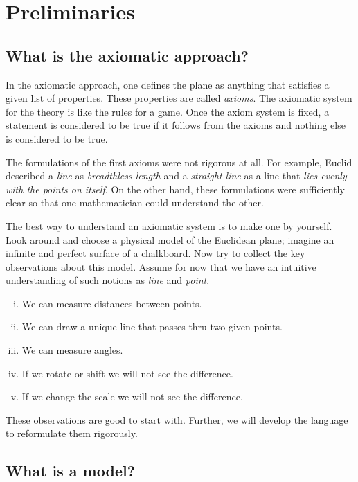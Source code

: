 \chapter{Preliminaries}\label{chap:metr}


\section{What is the axiomatic approach?}
\label{preaxioms}

In the axiomatic approach, one defines the plane as anything that satisfies a given list of properties.
These properties are called {}\emph{axioms}.
The axiomatic system for the theory 
is like the rules for a game.
Once the axiom system is fixed, a statement is considered to be true if it follows from the axioms and nothing else is considered to be true.

The formulations of the first axioms were not rigorous at all.
For example, Euclid described a {}\emph{line} as \textit{breadthless length}
and a {}\emph{straight line} as a line that \textit{lies evenly with the points on itself}.
On the other hand,
these formulations were sufficiently clear 
so that one mathematician could understand the other.

The best way to understand an axiomatic system
is to make one by yourself.
Look around and choose a physical model 
of the Euclidean plane;
imagine an infinite and perfect surface of a chalkboard. 
Now try to collect the key observations
about this model.
Assume for now that we have an intuitive understanding of such notions as {}\emph{line} and {}\emph{point}.
\begin{enumerate}[(i)]
 \item\label{preaxiomI} We can measure distances between points.
 \item\label{preaxiomII} We can draw a unique line 
 that passes thru two given points.
 \item\label{preaxiomIII} We can measure angles.
 \item\label{preaxiomIV} If we rotate or shift we will not see the difference.
 \item\label{preaxiomV} If we change the scale we will not see the difference.
\end{enumerate}
These observations are good to start with.
Further, we will develop the language to reformulate them rigorously.

\section{What is a model?}
\label{page:model}

